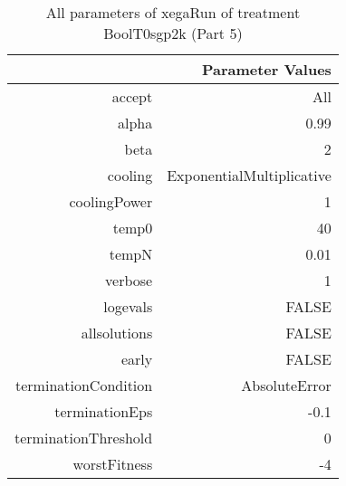 \begin{table}[ht]
\centering
\begin{tabular}{rr}
  \hline
 & Parameter Values \\ 
  \hline
accept & All \\ 
  alpha & 0.99 \\ 
  beta & 2 \\ 
  cooling & ExponentialMultiplicative \\ 
  coolingPower & 1 \\ 
  temp0 & 40 \\ 
  tempN & 0.01 \\ 
  verbose & 1 \\ 
  logevals & FALSE \\ 
  allsolutions & FALSE \\ 
  early & FALSE \\ 
  terminationCondition & AbsoluteError \\ 
  terminationEps & -0.1 \\ 
  terminationThreshold & 0 \\ 
  worstFitness & -4 \\ 
   \hline
\end{tabular}
\caption{ All parameters of xegaRun of treatment BoolT0sgp2k 
 (Part 5)} 
\end{table}
